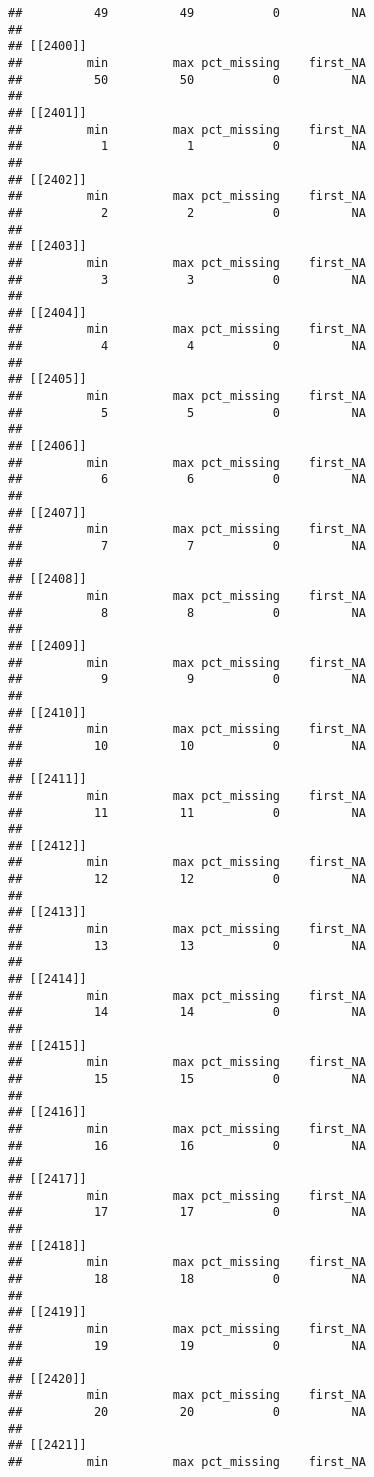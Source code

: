 \documentclass[
]{article}
\begin{document}
\begin{verbatim}
##          49          49           0          NA 
## 
## [[2400]]
##         min         max pct_missing    first_NA 
##          50          50           0          NA 
## 
## [[2401]]
##         min         max pct_missing    first_NA 
##           1           1           0          NA 
## 
## [[2402]]
##         min         max pct_missing    first_NA 
##           2           2           0          NA 
## 
## [[2403]]
##         min         max pct_missing    first_NA 
##           3           3           0          NA 
## 
## [[2404]]
##         min         max pct_missing    first_NA 
##           4           4           0          NA 
## 
## [[2405]]
##         min         max pct_missing    first_NA 
##           5           5           0          NA 
## 
## [[2406]]
##         min         max pct_missing    first_NA 
##           6           6           0          NA 
## 
## [[2407]]
##         min         max pct_missing    first_NA 
##           7           7           0          NA 
## 
## [[2408]]
##         min         max pct_missing    first_NA 
##           8           8           0          NA 
## 
## [[2409]]
##         min         max pct_missing    first_NA 
##           9           9           0          NA 
## 
## [[2410]]
##         min         max pct_missing    first_NA 
##          10          10           0          NA 
## 
## [[2411]]
##         min         max pct_missing    first_NA 
##          11          11           0          NA 
## 
## [[2412]]
##         min         max pct_missing    first_NA 
##          12          12           0          NA 
## 
## [[2413]]
##         min         max pct_missing    first_NA 
##          13          13           0          NA 
## 
## [[2414]]
##         min         max pct_missing    first_NA 
##          14          14           0          NA 
## 
## [[2415]]
##         min         max pct_missing    first_NA 
##          15          15           0          NA 
## 
## [[2416]]
##         min         max pct_missing    first_NA 
##          16          16           0          NA 
## 
## [[2417]]
##         min         max pct_missing    first_NA 
##          17          17           0          NA 
## 
## [[2418]]
##         min         max pct_missing    first_NA 
##          18          18           0          NA 
## 
## [[2419]]
##         min         max pct_missing    first_NA 
##          19          19           0          NA 
## 
## [[2420]]
##         min         max pct_missing    first_NA 
##          20          20           0          NA 
## 
## [[2421]]
##         min         max pct_missing    first_NA 

\end{verbatim}
\end{document}
